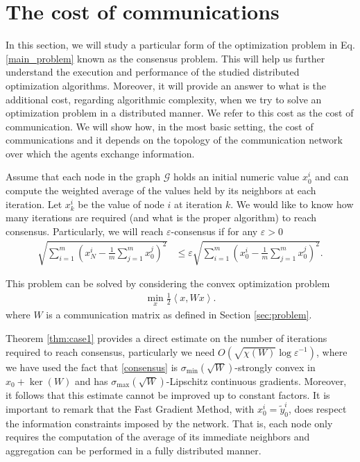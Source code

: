 \documentclass[final]{siamart1116}
\def\vb{\mathbf{v}}
\numberwithin{theorem}{section}
\begin{document}
	\section{The cost of communications}\label{sec:consensus}
	
	In this section, we will study a particular form of the optimization problem in Eq. \cref{main_problem} known as the consensus problem. This will help us further understand the execution and performance of the studied distributed optimization algorithms. Moreover, it will provide an answer to what is the additional cost, regarding algorithmic complexity, when we try to solve an optimization problem in a distributed manner. We refer to this cost as the cost of communication. We will show how, in the most basic setting, the cost of communications and it depends on the topology of the communication network over which the agents exchange information.
	
	Assume that each node in the graph $\mathcal{G}$ holds an initial numeric value {$x^i_0$} and can compute the {weighted} average of the values {held} by its neighbors at each iteration. {Let $x^i_k$ be the value of node $i$ at iteration $k$.} {We would like to know} how many iterations are required (and what is the proper algorithm) to reach consensus. Particularly, we will reach $\varepsilon$-consensus if for any $\varepsilon > 0$
	\begin{align*}
	\sqrt{\sum\limits_{i=1}^{{m}} \left(x^i_N - \frac{1}{{m}} \sum\limits_{j=1}^{{m}}{x^j_0}\right)^2} & \leq \varepsilon \sqrt{\sum\limits_{i=1}^{{m}} \left({x^i_0} - \frac{1}{{m}} \sum\limits_{j=1}^{{m}}{x^j_0}\right)^2}.
	\end{align*}
	
	This problem can be solved by considering the convex optimization problem
	\begin{align}\label{consensus}
	\min_{{x}} \frac{1}{2} \left\langle {x,Wx} \right\rangle.
	\end{align}
	where $W$ is a communication matrix as defined in Section \ref{sec:problem}.
	
	
	Theorem \ref{thm:case1} provides a direct estimate on the number of iterations required to reach consensus, particularly we need $O(\sqrt{\chi(W)}\log \varepsilon^{-1})$, where we have used the fact that \cref{consensus} is $\sigma_{\min}(\sqrt{W})$-strongly convex in  $x_0 +\ker(W)$ and has $\sigma_{\max}(\sqrt{W})$-Lipschitz continuous gradients. Moreover, it follows that this estimate cannot be improved up to constant factors. It is important to remark that the Fast Gradient Method, with $x^i_0 = \tilde y^i_0$, {does respect the information constraints imposed by the network}. That is, each node only requires the computation of the average of its immediate neighbors and aggregation can be performed in a fully distributed manner.
	
\end{document}
